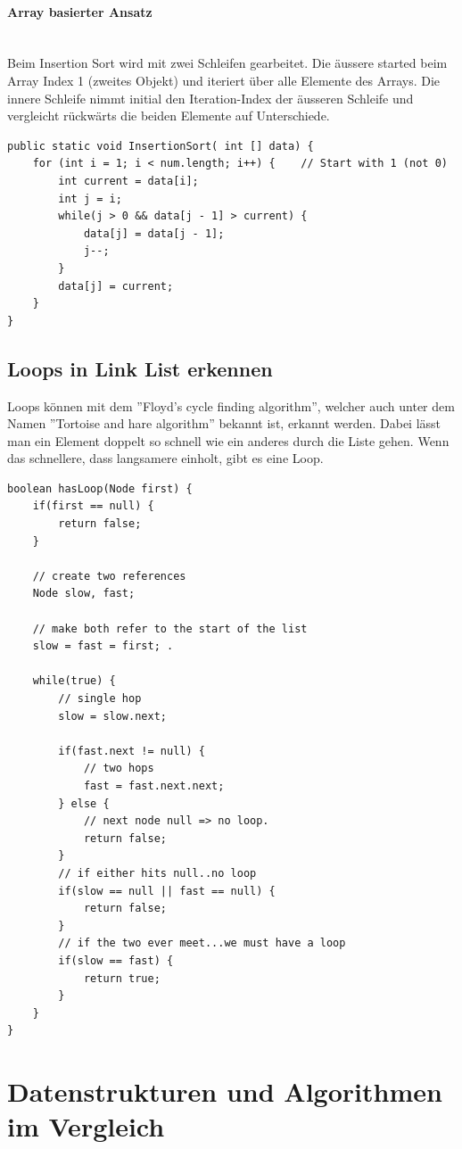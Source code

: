 \paragraph{Array basierter Ansatz} \hfill \\
Beim Insertion Sort wird mit zwei Schleifen gearbeitet. Die äussere started beim Array Index 1 (zweites Objekt) und iteriert über alle Elemente des Arrays. Die innere Schleife nimmt initial den Iteration-Index der äusseren Schleife und vergleicht rückwärts die beiden Elemente auf Unterschiede.
\begin{lstlisting}
public static void InsertionSort( int [] data) {
	for (int i = 1; i < num.length; i++) {    // Start with 1 (not 0)
		int current = data[i];
		int j = i;
		while(j > 0 && data[j - 1] > current) {
			data[j] = data[j - 1];
			j--;
		}
		data[j] = current;
	}
}
\end{lstlisting}

\subsection{Loops in Link List erkennen}
Loops können mit dem ''Floyd's cycle finding algorithm'', welcher auch unter dem Namen ''Tortoise and hare algorithm'' bekannt ist, erkannt werden. Dabei lässt man ein Element doppelt so schnell wie ein anderes durch die Liste gehen. Wenn das schnellere, dass langsamere einholt, gibt es eine Loop.

\begin{lstlisting}
boolean hasLoop(Node first) {
	if(first == null) {
		return false;
	}

	// create two references
	Node slow, fast; 
	
	// make both refer to the start of the list
	slow = fast = first; .

	while(true) {
		// single hop
		slow = slow.next;      
		
		if(fast.next != null) {
			// two hops
			fast = fast.next.next; 
		} else {
			// next node null => no loop.
			return false;          
		}
		// if either hits null..no loop
		if(slow == null || fast == null) {
			return false;
		} 
		// if the two ever meet...we must have a loop
		if(slow == fast) {
			return true;
		}
	}
}
\end{lstlisting}


\section{Datenstrukturen und Algorithmen im Vergleich}
